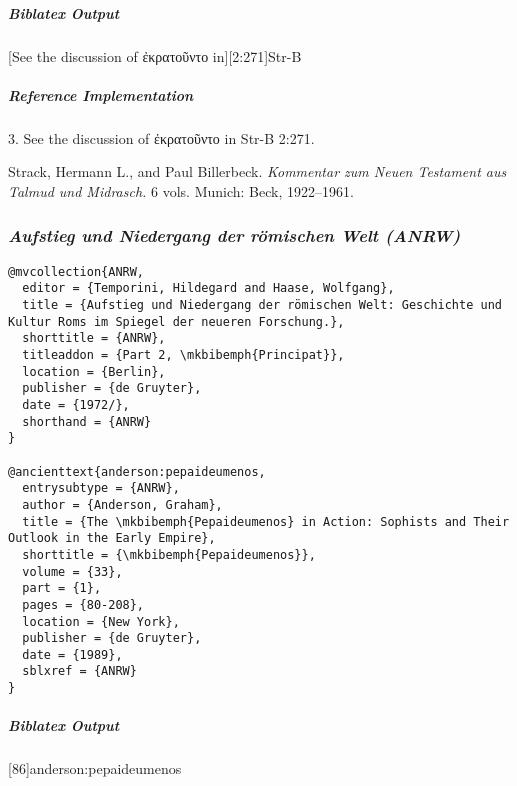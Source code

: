 \documentclass[a4paper]{article}
\newcommand{\textgreek}[1]{{\greekfont #1}}
\newenvironment{biboutput}{%
  \subparagraph{Biblatex Output}
}{\color{black}}
\newenvironment{refimp}{%
  \subparagraph{Reference Implementation}
  \color{reference-colour}
  \rm
}{\par\color{black}}
\begin{document}
\begin{biboutput}
  [See the discussion of \textgreek{ἐκρατοῦντο} in][2:271]{Str-B}
\end{biboutput}

\begin{refimp}
  \hspace*{\bibindent}3. See the discussion of \textgreek{ἐκρατοῦντο} in Str-B
  2:271.

  \hangindent\bibindent Strack, Hermann L., and Paul Billerbeck.
  \emph{Kommentar zum Neuen Testament aus Talmud und Midrasch.} 6 vols.
  Munich: Beck, 1922–1961.

  \sloppy{}
\end{refimp}

\subsubsection{\emph{Aufstieg und Niedergang der römischen Welt (ANRW)}}

\begin{lstlisting}
@mvcollection{ANRW,
  editor = {Temporini, Hildegard and Haase, Wolfgang},
  title = {Aufstieg und Niedergang der römischen Welt: Geschichte und Kultur Roms im Spiegel der neueren Forschung.},
  shorttitle = {ANRW},
  titleaddon = {Part 2, \mkbibemph{Principat}},
  location = {Berlin},
  publisher = {de Gruyter},
  date = {1972/},
  shorthand = {ANRW}
}

@ancienttext{anderson:pepaideumenos,
  entrysubtype = {ANRW},
  author = {Anderson, Graham},
  title = {The \mkbibemph{Pepaideumenos} in Action: Sophists and Their Outlook in the Early Empire},
  shorttitle = {\mkbibemph{Pepaideumenos}},
  volume = {33},
  part = {1},
  pages = {80-208},
  location = {New York},
  publisher = {de Gruyter},
  date = {1989},
  sblxref = {ANRW}
}
\end{lstlisting}

\begin{biboutput}
  [86]{anderson:pepaideumenos}
\end{biboutput}
\end{document}
